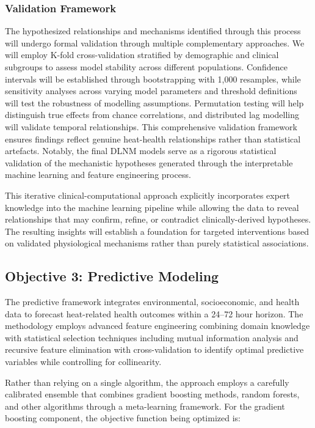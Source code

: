 \subsubsection{Validation Framework}
The hypothesized relationships and mechanisms identified through this process will undergo formal validation through multiple complementary approaches. We will employ K-fold cross-validation stratified by demographic and clinical subgroups to assess model stability across different populations. Confidence intervals will be established through bootstrapping with 1,000 resamples, while sensitivity analyses across varying model parameters and threshold definitions will test the robustness of modelling assumptions. Permutation testing will help distinguish true effects from chance correlations, and distributed lag modelling will validate temporal relationships. This comprehensive validation framework ensures findings reflect genuine heat-health relationships rather than statistical artefacts. Notably, the final DLNM models serve as a rigorous statistical validation of the mechanistic hypotheses generated through the interpretable machine learning and feature engineering process\citep{Gasparrini2015}.

This iterative clinical-computational approach explicitly incorporates expert knowledge into the machine learning pipeline while allowing the data to reveal relationships that may confirm, refine, or contradict clinically-derived hypotheses. The resulting insights will establish a foundation for targeted interventions based on validated physiological mechanisms rather than purely statistical associations.

\subsection{Objective 3: Predictive Modeling}
The predictive framework integrates environmental, socioeconomic, and health data to forecast heat-related health outcomes within a 24--72 hour horizon. The methodology employs advanced feature engineering combining domain knowledge with statistical selection techniques including mutual information analysis and recursive feature elimination with cross-validation to identify optimal predictive variables while controlling for collinearity.

Rather than relying on a single algorithm, the approach employs a carefully calibrated ensemble that combines gradient boosting methods, random forests, and other algorithms through a meta-learning framework. For the gradient boosting component, the objective function being optimized is:

